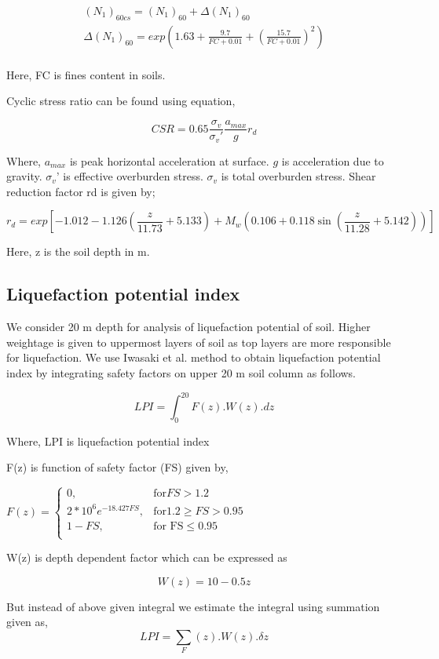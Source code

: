 \begin{gather}
({N_1})_{60cs} = ({N_1})_{60} + \Delta({N_1})_{60} \\
\Delta({N_1})_{60} = exp(1.63 + \frac{9.7}{FC+0.01} + (\frac{15.7}{FC+0.01})^2 ) \\
\end{gather}

Here, FC is fines content in soils.

Cyclic stress ratio can be found using equation,

\begin{equation}
CSR = 0.65 \frac{\sigma_v}{\sigma_v'} \frac{a_{max}}{g} r_d
\end{equation}

Where,
$a_{max}$ is peak horizontal acceleration at surface.
$g$ is acceleration due to gravity.
$\sigma_v’$ is effective overburden stress.
$\sigma_v$ is total overburden stress.
Shear reduction factor rd is given by;

\begin{equation}
r_d = exp[ -1.012 - 1.126 (\frac{z}{11.73} + 5.133) + M_w( 0.106 + 0.118 \sin ( \frac{z}{11.28} +5.142 ) ) ]
\end{equation}

Here, z is the soil depth in m.

\subsection{Liquefaction potential index}
We consider 20 m depth for analysis of liquefaction potential of soil. Higher weightage is given to uppermost layers of soil as top layers are more responsible for liquefaction. We use Iwasaki et al. method to obtain liquefaction potential index by integrating safety factors on upper 20 m soil column as follows.

\begin{equation}
LPI = \int_{0}^{20} F(z).W(z).dz
\end{equation}

Where,
LPI is liquefaction potential index 

F(z) is function of safety factor (FS) given by,

\begin{math}
F(z) = \begin{cases}
	0, & \text{for} FS > 1.2 \\
	2*10^6 e^{-18.427 FS}, & \text{for} 1.2 \geq FS > 0.95 \\
	1-FS, & \text{for FS} \leq 0.95 \\
	\end{cases}
\end{math}

W(z) is  depth dependent factor which can be expressed as 

\begin{equation}
W(z) = 10 - 0.5 z
\end{equation}

But instead of above given integral we estimate the integral using summation given as,
\begin{equation}
LPI = \sum_ F(z).W(z). \delta z
\end{equation}